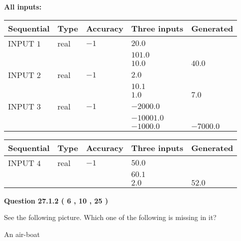 \documentclass[12pt]{article}
\begin{document}
   
   
   
\noindent\vspace{0.1in}\hspace{-0.08in} {\textbf{\Large{All inputs: }}}
   
   
  
  
\noindent\begin{tabular}{|l|l|l|l|l|}
\hline
 Sequential & Type & Accuracy & Three inputs & Generated \\ 
\hline
 
 
  INPUT $            1 $ & real & $           -1  $ & $
 20.0
  $ & \\
  & & &  $
 101.0
  $ & \\
  & & &  $
 10.0
 $ & $ 40.0 $ 
 \\  \hline  
 
 
  INPUT $            2 $ & real & $           -1  $ & $
 2.0
  $ & \\
  & & &  $
 10.1
  $ & \\
  & & &  $
 1.0
 $ & $ 7.0 $ 
 \\  \hline  
 
 
  INPUT $            3 $ & real & $           -1  $ & $
 -2000.0
  $ & \\
  & & &  $
 -10001.0
  $ & \\
  & & &  $
 -1000.0
 $ & $ -7000.0 $ 
 \\  \hline  
 \end{tabular}
   
   
  
  
\noindent\begin{tabular}{|l|l|l|l|l|}
\hline
 Sequential & Type & Accuracy & Three inputs & Generated \\ 
\hline
 
 
  INPUT $            4 $ & real & $           -1  $ & $
 50.0
  $ & \\
  & & &  $
 60.1
  $ & \\
  & & &  $
 2.0
 $ & $ 52.0 $ 
 \\  \hline  
 \end{tabular}
   
   
  
\vspace{0.2in}
  
{\textbf{\Large{Question
27.1.2 
 (           6 ,          10 ,          25 )
}}}
  
  
See the following picture.
Which one of the following is missing in it?
 
 
An air-boat
 
\end{document}

